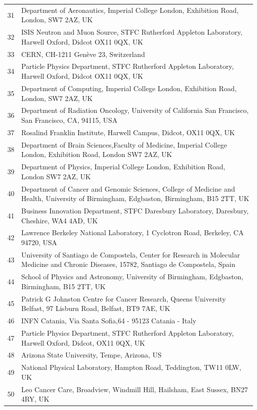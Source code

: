 {\begin{tabular}{ c p{15cm} }
     31 & Department of Aeronautics, Imperial College London, Exhibition Road, London, SW7 2AZ, UK\\
     32 & ISIS Neutron and Muon Source, STFC Rutherford Appleton Laboratory, Harwell Oxford, Didcot OX11 0QX, UK\\
     33 & CERN, CH-1211 Gen\`eve 23, Switzerland\\
     34 & Particle Physics Department, STFC Rutherford Appleton Laboratory, Harwell Oxford, Didcot OX11 0QX, UK\\
     35 & Department of Computing, Imperial College London, Exhibition Road, London, SW7 2AZ, UK\\
     36 & Department of Radiation Oncology, University of California San Francisco, San Francisco, CA, 94115, USA\\
     37 & Rosalind Franklin Institute, Harwell Campus, Didcot, OX11 0QX, UK\\
     38 & Department of Brain Sciences,Faculty of Medicine, Imperial College London, Exhibition Road, London SW7 2AZ, UK\\
     39 & Department of Physics, Imperial College London, Exhibition Road, London SW7 2AZ, UK\\
     40 & Department of Cancer and Genomic Sciences, College of Medicine and Health, University of Birmingham, Edgbaston, Birmingham, B15 2TT, UK\\
     41 & Business Innovation Department, STFC Daresbury Laboratory, Daresbury, Cheshire, WA4 4AD, UK\\
     42 & Lawrence Berkeley National Laboratory, 1 Cyclotron Road, Berkeley, CA 94720, USA\\
     43 & University of Santiago de Compostela, Center for Research in Molecular Medicine and Chronic Diseases, 15782, Santiago de Compostela, Spain\\
     44 & School of Physics and Astronomy, University of Birmingham, Edgbaston, Birmingham, B15 2TT, UK\\
     45 & Patrick G Johnston Centre for Cancer Research, Queens University Belfast, 97 Lisburn Road, Belfast, BT9 7AE, UK\\
     46 & INFN Catania, Via Santa Sofia,64 - 95123 Catania - Italy\\
     47 & Particle Physics Department, STFC Rutherford Appleton Laboratory, Harwell Oxford, Didcot, OX11 0QX, UK\\
     48 & Arizona State University, Tempe, Arizona, US\\
     49 & National Physical Laboratory, Hampton Road, Teddington, TW11 0LW, UK\\
     50 & Leo Cancer Care, Broadview, Windmill Hill, Hailsham, East Sussex, BN27 4RY, UK\\
  \end{tabular}
}
